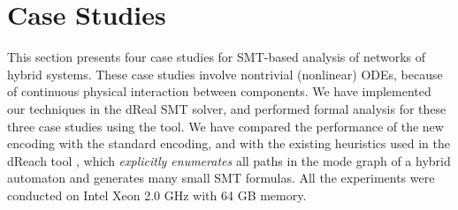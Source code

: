 
%
\section{Case Studies}
\label{sec:case-studies}

This section presents
four case studies for SMT-based analysis of 
networks of hybrid systems.
%
These case studies involve nontrivial (nonlinear) ODEs,
because of continuous physical interaction between components.
%
We have implemented our techniques in the dReal SMT solver, and 
performed formal analysis for these three case studies using the tool.
%
We have compared the performance of  the new encoding
with the standard encoding,
and with the existing heuristics used in the dReach tool \cite{dReach},
which
\emph{explicitly enumerates} all paths in the mode graph of a hybrid automaton
and generates many small SMT formulas.
%
All the experiments %
were conducted on Intel Xeon 2.0 GHz with 64 GB memory.




